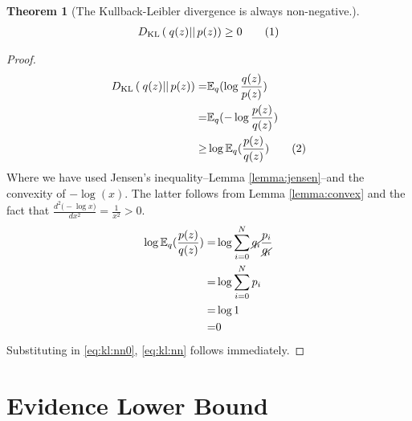 \documentclass[]{article}
\newcommand{\Expectation} {\mathbb{E}}
\newcommand{\KLD}[2]{D_{\mathrm{KL}} \left( \left. \left. #1 \right|\right| #2 \right) }
\newcommand\numberthis    {\addtocounter{equation}{1}\tag{\theequation}}
\newtheorem{thm}{Theorem}
\begin{document}
\begin{thm}[The Kullback-Leibler divergence is always non-negative.]\label{thm:kl:ge}
	\begin{align*}
		\KLD{q(z)}{p(z)} \ge 0 \numberthis \label{eq:kl:nn}
	\end{align*}
\end{thm}
\begin{proof}
	\begin{align*}
		\KLD{q(z)}{p(z)} = & \Expectation_q(\log{\frac{q(z)}{p(z)}})\\
        = & \Expectation_q(-\log{\frac{p(z)}{q(z)}})\\
         \ge &\log{\Expectation_q(\frac{p(z)}{q(z)})} \numberthis \label{eq:kl:nn0}
	\end{align*}
	 Where we have used  Jensen's inequality--Lemma \ref{lemma:jensen}--and the convexity of $-\log(x)$. The latter follows from Lemma \ref{lemma:convex} and the fact that $\frac{d^2\big(-\log{x}\big)}{dx^2}=\frac{1}{x^2}>0$. 
	\begin{align*}
		\log{\Expectation_q(\frac{p(z)}{q(z)})} =& \log{\sum_{i=0}^{N}\cancel{q_i}\frac{p_i}{\cancel{q_i}}}\\
		=& \log{\sum_{i=0}^{N}p_i}\\
		=& \log{1}\\
		=& 0
	\end{align*}
   Substituting in \eqref{eq:kl:nn0}, \eqref{eq:kl:nn} follows immediately.
\end{proof}

\section{Evidence Lower Bound}\label{sect:elbo}
\end{document}
